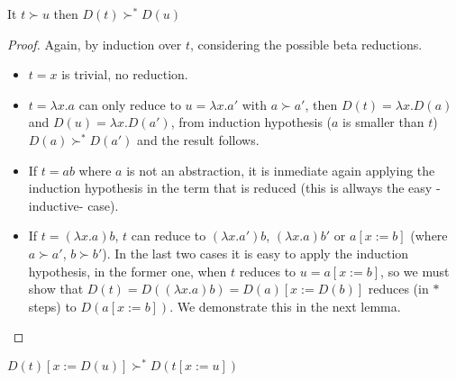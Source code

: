 \begin{lemma}
  It $t \succ u$ then $D(t) \succ^{*} D(u)$
\end{lemma}
\begin{proof}
  Again, by induction over $t$, considering the possible beta reductions.

  \begin{itemize}
  \item
    $t=x$ is trivial, no reduction.
  \item
    $t= \lambda x. a$ can only reduce to $u = \lambda x. a'$
    with $a \succ a'$,
    then $D(t) = \lambda x. D(a)$ and $D(u) = \lambda x . D(a')$, from
    induction hypothesis ($a$ is smaller than $t$) $D(a) \succ^{*} D(a')$ and
    the result follows.
  \item
    If $t = a b$ where $a$ is not an abstraction, it is inmediate again
    applying the induction hypothesis in the term that is reduced
    (this is allways the easy -inductive- case).
  \item
    If $t = (\lambda x. a) b$, $t$ can reduce to $(\lambda x . a') b$,
    $(\lambda x . a) b'$ or $a[x:= b]$ (where $a \succ a'$, $b \succ b'$).
    In the last two cases it is easy to apply the induction hypothesis,
    in the former one, when $t$ reduces to $ u = a[x:= b]$, so we must
    show that $D(t) = D((\lambda x . a) b) = D(a)[x := D(b)]$ reduces
    (in $*$ steps) to
    $D(a[x:= b])$. We demonstrate this in the next lemma.
  \end{itemize}
\end{proof}

\begin{lemma}
  $D(t)[x:= D(u)] \succ^{*} D(t[x:=u])$
\end{lemma}

